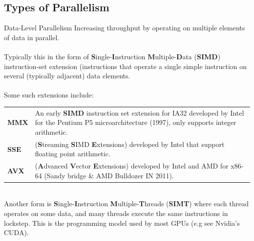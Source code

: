 \subsection{Types of Parallelism}
\begin{definitionbox}{Data-Level Parallelism}
    Increasing throughput by operating on multiple elements of data in parallel.
    \\
    \\ Typically this in the form of \textbf{S}ingle-\textbf{I}nstruction \textbf{M}ultiple-\textbf{D}ata 
    (\textbf{SIMD}) instruction-set extension (instructions that operate a single simple instruction on several 
    (typically adjacent) data elements. 
    \\
    \\ Some such extensions include:
    \vspace{2mm}
    \\ \begin{tabular}{l p{}}
        \textbf{MMX} & An early \textbf{SIMD} instruction set extension for IA32 developed by Intel for the Pentium P5 microarchitecture (1997), only supports integer arithmetic. \\
        \textbf{SSE} & (\textbf{S}treaming \textbf{S}IMD \textbf{E}xtensions) developed by Intel that support floating point arithmetic. \\
        \textbf{AVX} & (\textbf{A}dvanced \textbf{V}ector \textbf{E}xtensions) developed by Intel and AMD for x86-64 (Sandy bridge \& AMD Bulldozer IN 2011). \\
    \end{tabular}
    \vspace{2mm}
    \\ Another form is \textbf{S}ingle-\textbf{I}nstruction \textbf{M}ultiple-\textbf{T}hreads (\textbf{SIMT}) where each thread operates on some data, and many threads execute the same instructions in lockstep. This is the programming model used by most GPUs (e.g see Nvidia's CUDA).
\end{definitionbox}

